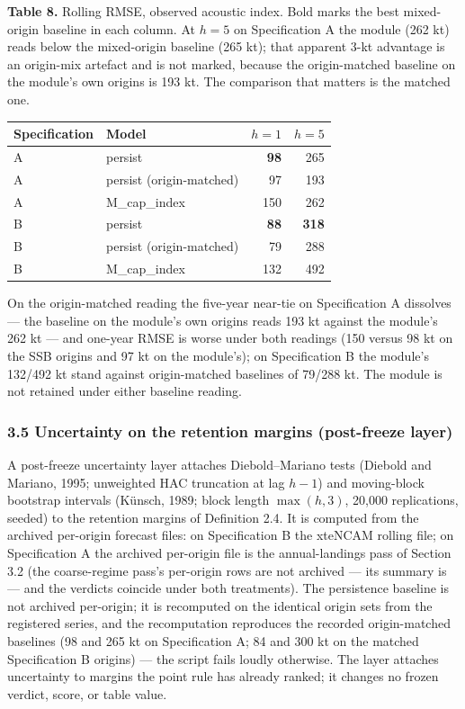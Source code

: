 \documentclass[11pt]{article}
\begin{document}
\textbf{Table 8.} Rolling RMSE, observed acoustic index. Bold marks the
best mixed-origin baseline in each column. At \(h=5\) on Specification A
the module (262 kt) reads below the mixed-origin baseline (265 kt); that
apparent 3-kt advantage is an origin-mix artefact and is not marked,
because the origin-matched baseline on the module's own origins is
193 kt. The comparison that matters is the matched one.

\begin{longtable}[]{@{}llrr@{}}
\toprule\noalign{}
Specification & Model & \(h=1\) & \(h=5\) \\
\midrule\noalign{}
\endhead
\bottomrule\noalign{}
\endlastfoot
A & persist & \textbf{98} & 265 \\
A & persist (origin-matched) & 97 & 193 \\
A & M\_cap\_index & 150 & 262 \\
B & persist & \textbf{88} & \textbf{318} \\
B & persist (origin-matched) & 79 & 288 \\
B & M\_cap\_index & 132 & 492 \\
\end{longtable}

On the origin-matched reading the five-year near-tie on Specification A
dissolves --- the baseline on the module's own origins reads 193 kt
against the module's 262 kt --- and one-year RMSE is worse under both
readings (150 versus 98 kt on the SSB origins and 97 kt on the
module's); on Specification B the module's 132/492 kt stand against
origin-matched baselines of 79/288 kt. The module is not retained under
either baseline reading.

\subsubsection{3.5 Uncertainty on the retention margins (post-freeze
layer)}\label{uncertainty-on-the-retention-margins-post-freeze-layer}

A post-freeze uncertainty layer attaches Diebold--Mariano tests (Diebold
and Mariano, 1995; unweighted HAC truncation at lag \(h-1\)) and
moving-block bootstrap intervals (K\"unsch, 1989; block length
\(\max(h,3)\), 20,000 replications, seeded) to the retention margins of
Definition 2.4. It is computed from the archived per-origin forecast
files: on Specification B the xteNCAM rolling file; on Specification A
the archived per-origin file is the annual-landings pass of Section 3.2
(the coarse-regime pass's per-origin rows are not archived --- its
summary is --- and the verdicts coincide under both treatments). The
persistence baseline is not archived per-origin; it is recomputed on the
identical origin sets from the registered series, and the recomputation
reproduces the recorded origin-matched baselines (98 and 265 kt on
Specification A; 84 and 300 kt on the matched Specification B origins)
--- the script fails loudly otherwise. The layer attaches uncertainty to
margins the point rule has already ranked; it changes no frozen verdict,
score, or table value.
\end{document}
